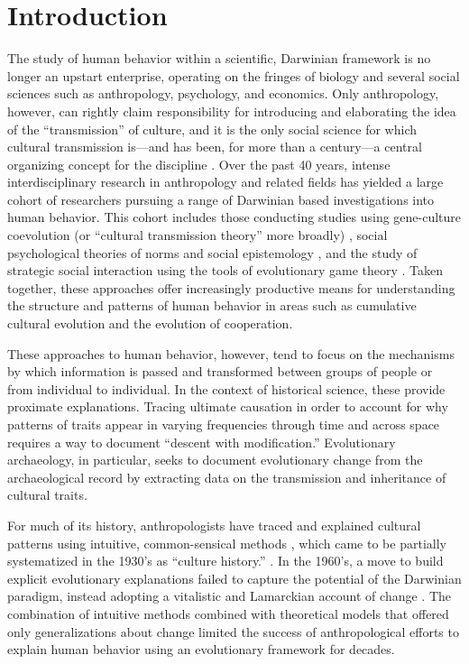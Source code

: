 \section{Introduction}
\label{sec:introduction}
The study of human behavior within a scientific, Darwinian framework is no longer an upstart enterprise, operating on the fringes of biology and several social sciences such as anthropology, psychology, and economics. Only anthropology, however, can rightly claim responsibility for introducing and elaborating the idea of the “transmission” of culture, and it is the only social science for which cultural transmission is—and has been, for more than a century—a central organizing concept for the discipline \citep{lyman2008cultural}. Over the past 40 years, intense interdisciplinary research in anthropology and related fields has yielded a large cohort of researchers pursuing a range of Darwinian based investigations into human behavior. This cohort includes those conducting studies using gene-culture coevolution (or “cultural transmission theory” more broadly) , social psychological theories of norms and social epistemology , and the study of strategic social interaction using the tools of evolutionary game theory . Taken together, these approaches offer increasingly productive means for understanding the structure and patterns of human behavior in areas such as cumulative cultural evolution and the evolution of cooperation. 

These approaches to human behavior, however, tend to focus on the mechanisms by which information is passed and transformed between groups of people or from individual to individual.  In the context of historical science, these provide proximate explanations.   Tracing ultimate causation in order to account for why patterns of traits appear in varying frequencies through time and across space requires a way to document ``descent with modification.''  Evolutionary archaeology, in particular, seeks to document evolutionary change from the archaeological record by extracting data on the transmission and inheritance of cultural traits.  

For much of its history, anthropologists have traced and explained cultural patterns using intuitive, common-sensical methods , which came to be partially systematized in the 1930's as ``culture history.'' \citep{lyman1997rise,lyman2001direct,Lyman2003a,lyman2008cultural,o1998james,o2000time}.  In the 1960's, a move to build explicit evolutionary explanations failed to capture the potential of the Darwinian paradigm, instead adopting a vitalistic and Lamarckian account of change \citep{Dunnell1980}.  The combination of intuitive methods combined with theoretical models that offered only generalizations about change limited the success of anthropological efforts to explain human behavior using an evolutionary framework for decades. 

